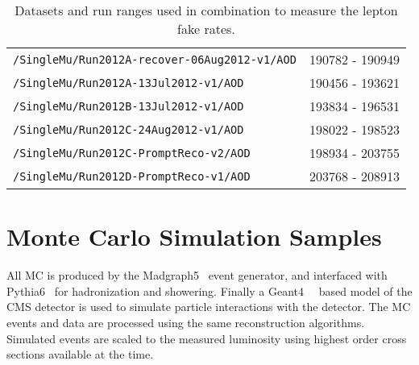 \begin{table}[hbt]
\begin{center}
\begin{tabular}{lc}
\verb=/SingleMu/Run2012A-recover-06Aug2012-v1/AOD=                    &     190782 - 190949                  \\ 
\verb=/SingleMu/Run2012A-13Jul2012-v1/AOD=                                     &  190456 - 193621                     \\ 
\verb=/SingleMu/Run2012B-13Jul2012-v1/AOD=                                     &  193834 - 196531 \\ 
\verb=/SingleMu/Run2012C-24Aug2012-v1/AOD=                                   &   198022 - 198523                   \\ 
\verb=/SingleMu/Run2012C-PromptReco-v2/AOD=                                  &   198934 - 203755                    \\ 
\verb=/SingleMu/Run2012D-PromptReco-v1/AOD=                                  &  203768 - 208913   \\
 \hline\hline
\end{tabular}
\caption{\label{tab:FRDsets}Datasets and run ranges used in combination to measure the lepton fake rates.}
\end{center}
\end{table}

%

	
	
	
	
\section{Monte Carlo Simulation Samples}
\label{sec:MCSamples}

All MC is produced by the Madgraph5~\cite{Alwall:2011uj} event generator, and interfaced with Pythia6~\cite{pythia6} for hadronization and showering. Finally a Geant4~\cite{geant4applications}~\cite{geant4toolkit} based model of the CMS detector is used to simulate particle interactions with the detector. The MC events and data are processed using the same reconstruction algorithms. Simulated events are scaled to the measured luminosity using highest order cross sections available at the time.

